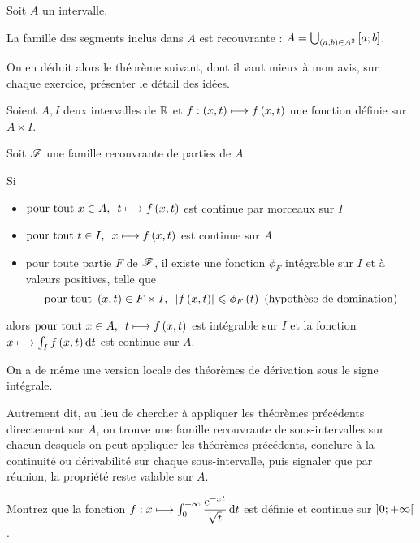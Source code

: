 \begin{prop}
Soit \(A\) un intervalle.

La famille des segments inclus dans \(A\) est recouvrante : \(A=\bigcup_{\left(a,b\right)\in A^2}\left[a;b\right]\).
\end{prop}

On en déduit alors le théorème suivant, dont il vaut mieux à mon avis, sur chaque exercice, présenter le détail des idées.

\begin{theo}
Soient \(A,I\) deux intervalles de \(\mathbb{R}\) et \(f:\left(x,t\right)\longmapsto f\left(x,t\right)\) une fonction définie sur \(A\times I\).

Soit \(\mathscr{F}\) une famille recouvrante de parties de \(A\).

Si

\begin{itemize}
    \item \(\quantifs{\tpt x\in A}t\mapsto f\paren{x,t}\) est continue par morceaux sur \(I\) \\
    \item \(\quantifs{\tpt t\in I}x\mapsto f\paren{x,t}\) est continue sur \(A\) \\
    \item pour toute partie \(F\) de \(\mathscr{F}\), il existe une fonction \(\phi_F\) intégrable sur \(I\) et à valeurs positives, telle que \[\quantifs{\tpt\paren{x,t}\in F\times I}\abs{f\paren{x,t}}\leq\phi_F\paren{t}\text{ (hypothèse de domination)}\]
\end{itemize}

alors \(\quantifs{\tpt x\in A}t\mapsto f\paren{x,t}\) est intégrable sur \(I\) et la fonction \(x\mapsto\int_If\paren{x,t}\odif{t}\) est continue sur \(A\).
\end{theo}

On a de même une version locale des théorèmes de dérivation sous le signe intégrale.

Autrement dit, au lieu de chercher à appliquer les théorèmes précédents directement sur \(A\), on trouve une famille recouvrante de sous-intervalles sur chacun desquels on peut appliquer les théorèmes précédents, conclure à la continuité ou dérivabilité sur chaque sous-intervalle, puis signaler que par réunion, la propriété reste valable sur \(A\).

\begin{exo}
Montrez que la fonction \(f:x\mapsto\int_0^{\pinf}\dfrac{\e{-xt}}{\sqrt{t}}\odif{t}\) est définie et continue sur \(\left]0;+\infty\right[\).
\end{exo}


